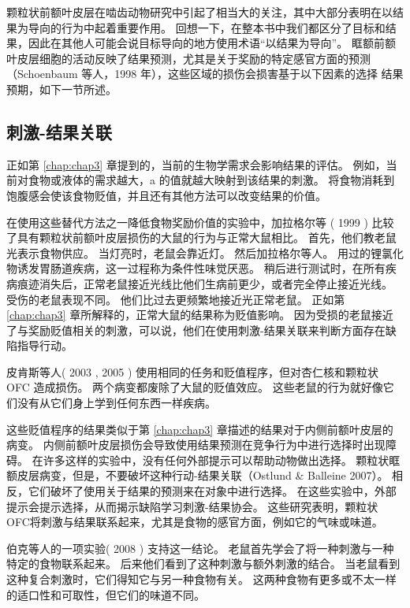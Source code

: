 颗粒状前额叶皮层在啮齿动物研究中引起了相当大的关注，其中大部分表明在以结果为导向的行为中起着重要作用。
回想一下，在整本书中我们都区分了目标和结果，因此在其他人可能会说目标导向的地方使用术语“以结果为导向”。
眶额前额叶皮层细胞的活动反映了结果预测，尤其是关于奖励的特定感官方面的预测（Schoenbaum 等人，1998 年），这些区域的损伤会损害基于以下因素的选择
结果预期，如下一节所述。



\subsection{刺激-结果关联}

正如第 \ref{chap:chap3} 章提到的，当前的生物学需求会影响结果的评估。
例如，当前对食物或液体的需求越大，a 的值就越大映射到该结果的刺激。
将食物消耗到饱腹感会使该食物贬值，并且还有其他方法可以改变结果的价值。\par


在使用这些替代方法之一降低食物奖励价值的实验中，加拉格尔等 ( 1999 ) 比较了具有颗粒状前额叶皮层损伤的大鼠的行为与正常大鼠相比。
首先，他们教老鼠光表示食物供应。
当灯亮时，老鼠会靠近灯。
然后加拉格尔等人。 用过的锂氯化物诱发胃肠道疾病，这一过程称为条件性味觉厌恶。
稍后进行测试时，在所有疾病痕迹消失后，正常老鼠接近光线比他们生病前更少，或者完全停止接近光线。
受伤的老鼠表现不同。
他们比过去更频繁地接近光正常老鼠。
正如第 \ref{chap:chap3} 章所解释的，正常大鼠的结果称为贬值影响。
因为受损的老鼠接近了与奖励贬值相关的刺激，可以说，他们在使用刺激-结果关联来判断方面存在缺陷指导行动。\par


皮肯斯等人( 2003 , 2005 ) 使用相同的任务和贬值程序，但对杏仁核和颗粒状 OFC 造成损伤。
两个病变都废除了大鼠的贬值效应。
这些老鼠的行为就好像它们没有从它们身上学到任何东西一样疾病。\par


这些贬值程序的结果类似于第 \ref{chap:chap3} 章描述的结果对于内侧前额叶皮层的病变。
内侧前额叶皮层损伤会导致使用结果预测在竞争行为中进行选择时出现障碍。
在许多这样的实验中，没有任何外部提示可以帮助动物做出选择。
颗粒状眶额皮层病变，但是，不要破坏这种行动-结果关联（Ostlund \& Balleine 2007）。
相反，它们破坏了使用关于结果的预测来在对象中进行选择。
在这些实验中，外部提示会提示选择，从而揭示缺陷学习刺激-结果协会。
这些研究表明，颗粒状 OFC将刺激与结果联系起来，尤其是食物的感官方面，例如它的气味或味道。\par


伯克等人的一项实验( 2008 ) 支持这一结论。
老鼠首先学会了将一种刺激与一种特定的食物联系起来。 后来他们看到了这种刺激与额外刺激的结合。
当老鼠看到这种复合刺激时，它们得知它与另一种食物有关。
这两种食物有更多或不太一样的适口性和可取性，但它们的味道不同。\par


